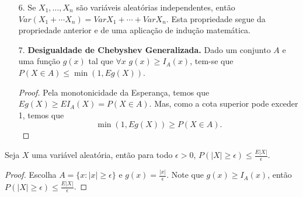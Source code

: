 %
\begin{frame}
%
%
\begin{itemize}
%
%
\item[6.] Se $X_1,\ldots,X_n$ são variáveis aleatórias independentes,
então $Var(X_1+\cdots X_n)=Var X_1+\cdots +Var X_n$. Esta
propriedade segue da propriedade anterior e de uma aplicação de
indução matemática.

\item[7.] {\bf Desigualdade de Chebyshev Generalizada.} Dado um conjunto
$A$ e uma função $g(x)$ tal que $\forall x$ $g(x)\geq I_A(x)$, tem-se
que $P(X\in A)\leq \min(1,Eg(X))$.

\begin{proof} Pela monotonicidade da Esperança, temos que $Eg(X)\geq
EI_A(X)=P(X\in A)$. Mas, como a cota superior pode exceder 1, temos
que $$\min(1,Eg(X))\geq P(X\in A).$$ \end{proof}

\end{itemize}

%
%
%
%
\begin{corol} Seja $X$ uma
variável aleatória, então para todo $\epsilon>0$, $P(|X|\geq \epsilon)\leq \frac{E|X|
}{\epsilon}$. \end{corol}

\begin{proof}
Escolha $A=\{x:|x|\geq \epsilon\}$ e $g(x)=\frac{|x|}{\epsilon}$. Note que $g(x)\geq I_A(x)$, então $P(|X|\geq \epsilon)\leq \frac{E|X|}{\epsilon}$.
\end{proof}
\end{frame}
%
